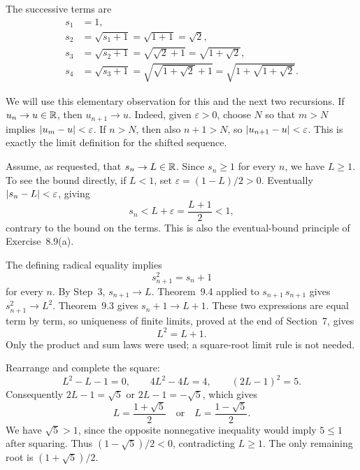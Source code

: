 The successive terms are
\begin{align*}
 s_1&=1,\\
 s_2&=\sqrt{s_1+1}=\sqrt{1+1}=\sqrt2,\\
 s_3&=\sqrt{s_2+1}=\sqrt{\sqrt2+1}
      =\sqrt{1+\sqrt2},\\
 s_4&=\sqrt{s_3+1}=\sqrt{\sqrt{1+\sqrt2}+1}
      =\sqrt{1+\sqrt{1+\sqrt2}}.
\end{align*}

We will use this elementary observation for this and the next two
recursions. If $u_n\to u\in\mathbb{R}$, then $u_{n+1}\to u$.
Indeed, given $\varepsilon>0$, choose $N$ so that
$m>N$ implies $\left|u_m-u\right|<\varepsilon$.
If $n>N$, then also $n+1>N$, so
$\left|u_{n+1}-u\right|<\varepsilon$. This is exactly the limit
definition for the shifted sequence.

Assume, as requested, that $s_n\to L\in\mathbb{R}$.
Since $s_n\ge1$ for every $n$, we have $L\ge1$.
To see the bound directly, if $L<1$, set
$\varepsilon=(1-L)/2>0$. Eventually
$\left|s_n-L\right|<\varepsilon$, giving
\[
 s_n<L+\varepsilon=\frac{L+1}{2}<1,
\]
contrary to the bound on the terms. This is also the eventual-bound
principle of Exercise~8.9(a).

The defining radical equality implies
\[
 s_{n+1}^2=s_n+1
\]
for every $n$. By Step~3, $s_{n+1}\to L$.
Theorem~9.4 applied to $s_{n+1}\,s_{n+1}$ gives
$s_{n+1}^2\to L^2$. Theorem~9.3 gives
$s_n+1\to L+1$. These two expressions are equal term by term,
so uniqueness of finite limits, proved at the end of Section~7,
gives
\[
 L^2=L+1.
\]
Only the product and sum laws were used; a square-root limit rule
is not needed.

Rearrange and complete the square:
\[
 L^2-L-1=0,
 \qquad 4L^2-4L=4,
 \qquad (2L-1)^2=5.
\]
Consequently $2L-1=\sqrt5$ or $2L-1=-\sqrt5$, which gives
\[
 L=\frac{1+\sqrt5}{2}
 \quad\text{or}\quad L=\frac{1-\sqrt5}{2}.
\]
We have $\sqrt5>1$, since the opposite nonnegative inequality
would imply $5\le1$ after squaring. Thus
$(1-\sqrt5)/2<0$, contradicting $L\ge1$.
The only remaining root is $(1+\sqrt5)/2$.


